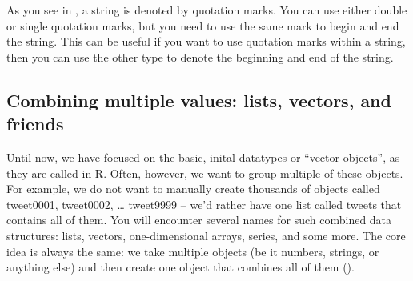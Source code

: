 As you see in , a string is denoted by quotation
marks. You can use either double or single quotation marks, but you
need to use the same mark to begin and end the string. This can be
useful if you want to use quotation marks within a string, then you can
use the other type to denote the beginning and end of the string.



\subsection{Combining multiple values: lists, vectors, and friends}

Until now, we have focused on the basic, inital datatypes or ``vector
objects'', as they are called in R.  Often, however, we want to group
multiple of these objects. For example, we do not want to manually
create thousands of objects called tweet0001, tweet0002, \ldots
tweet9999 -- we'd rather have one list called tweets that contains all
of them. You will encounter several names for such combined data
structures: lists, vectors, one-dimensional arrays, series, and some
more. 
The core idea is always the same: we take multiple objects
(be it numbers, strings, or anything else) and then create one object that combines all of them ().



